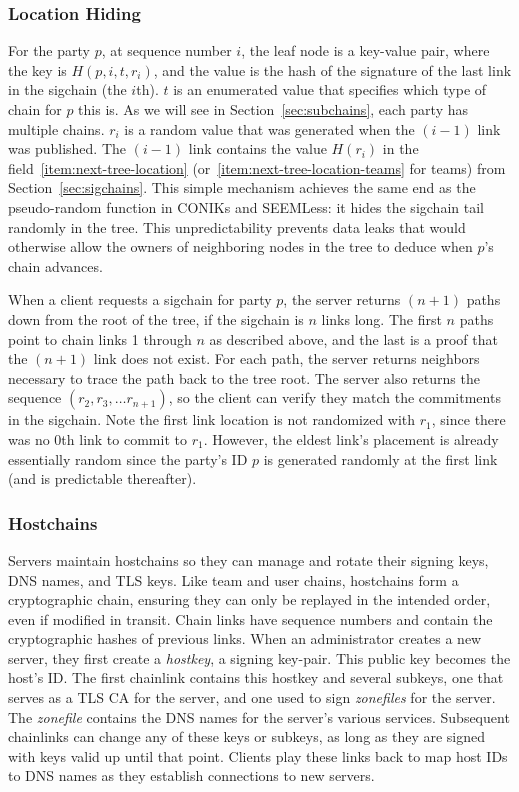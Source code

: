 \subsubsection{Location Hiding}
\label{sec:location-hiding}

For the party $p$, at sequence number $i$, the leaf node is a key-value pair,
where the key is $H(p,i,t,r_i)$, and the value is the hash of the signature of
the last link in the sigchain (the $i$th). $t$ is an enumerated value that
specifies which type of chain for $p$ this is. As we will see in 
Section~\ref{sec:subchains}, each party has multiple chains.  $r_i$ is a random
value that was generated when the $(i-1)$ link was published. The $(i-1)$ link
contains the value $H(r_i)$ in the field~\ref{item:next-tree-location}
(or~\ref{item:next-tree-location-teams} for teams) from
Section~\ref{sec:sigchains}. This simple mechanism achieves the same end as the
pseudo-random function in CONIKs and SEEMLess: it hides the sigchain tail randomly
in the tree. This unpredictability prevents data leaks that would
otherwise allow the owners of neighboring nodes in the tree to deduce when $p$'s
chain advances. 

When a client requests a sigchain for party $p$, the server returns $(n+1)$
paths down from the root of the tree, if the sigchain is $n$ links long. The
first $n$ paths point to chain links 1 through $n$ as described above, and the
last is a proof that the $(n+1)$ link does not exist. For each path, the server
returns neighbors necessary to trace the path back to the tree root. The server
also returns the sequence $(r_2, r_3, \dots r_{n+1})$, so the client can verify
they match the commitments in the sigchain.  Note the first link location is not
randomized with $r_1$, since there was no $0$th link to commit to $r_1$.
However, the eldest link's placement is already essentially random since the
party's ID $p$ is generated randomly at the first link (and is predictable
thereafter).


\subsubsection{Hostchains}
\label{sec:hostchains}

Servers maintain hostchains so they can manage and rotate their signing keys, DNS names,
and TLS keys. Like team and user chains, hostchains form a cryptographic chain, ensuring
they can only be replayed in the intended order, even if modified in transit. Chain links
have sequence numbers and contain the cryptographic hashes of previous links. When an
administrator creates a new server, they first create a \textit{hostkey}, a signing key-pair.
This public key becomes the host's ID. The first chainlink contains this hostkey and several
subkeys, one that serves as a TLS CA for the server, and one used to sign \textit{zonefiles}
for the server. The \textit{zonefile} contains the DNS names for the server's various services.
Subsequent chainlinks can change any of these keys
or subkeys, as long as they are signed with keys valid up until that point. Clients
play these links back to map host IDs to DNS names as they establish connections
to new servers. 


